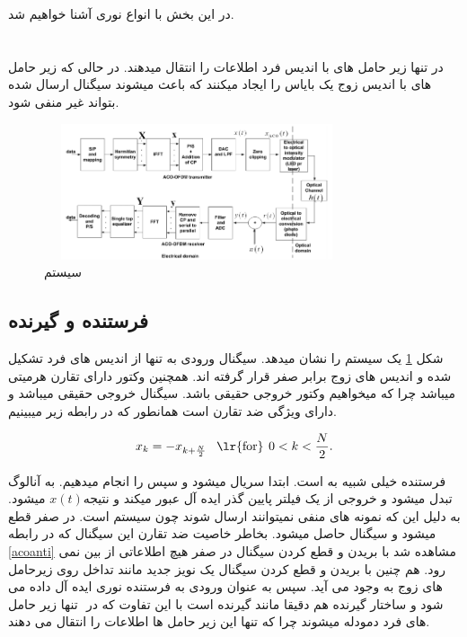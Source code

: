 \documentclass{article}
\begin{document}
در این بخش با انواع   نوری آشنا خواهیم شد.
\section{}


در        
تنها زیر حامل های با اندیس فرد اطلاعات را انتقال میدهند. در حالی که زیر حامل های با اندیس زوج یک بایاس را ایجاد میکنند که باعث میشوند  سیگنال  ارسال شده بتواند غیر منفی شود.\cite{2}\ 
\begin{figure}[h!]
\begin{center}
\includegraphics[width=9cm, height=4cm]{aco.PNG}
\end{center}
\caption{  سیستم }
\label{acomodel}

\end{figure}
\subsection{فرستنده و گیرنده}

 شکل \ref{acomodel} یک سیستم  را نشان میدهد. سیگنال ورودی به  تنها از اندیس های فرد تشکیل شده و اندیس های زوج برابر صفر قرار گرفته اند. ‌همچنین وکتور   دارای تقارن هرمیتی   میباشد چرا که میخواهیم وکتور خروجی    حقیقی باشد.\cite{1} سیگنال خروجی    حقیقی میباشد و دارای ویژگی ضد تقارن  است  همانطور که در رابطه زیر میبینیم.\cite{6}

\begin{equation}
x_{k} = -x_{k+\frac{N}{2}}    \hspace{8pt}\textrm{\lr{for}}  \hspace{4pt}  0 < k < \frac{N}{2} .
\label{acoanti}
\end{equation}

فرستنده  خیلی شبیه به  است. ابتدا  سریال میشود و سپس   را انجام میدهیم.    به آنالوگ تبدل میشود و خروجی از یک فیلتر پایین گذر ایده آل عبور میکند و نتیجه$ x(t)‌$ میشود. به دلیل این که نمونه های منفی نمیتوانند ارسال شوند چون سیستم  است. در صفر قطع میشود و سیگنال حاصل میشود. بخاطر خاصیت ضد تقارن این سیگنال که در رابطه \ref{acoanti}  مشاهده شد با بریدن و قطع کردن سیگنال در صفر هیچ اطلاعاتی از بین نمی رود. هم چنین با بریدن و قطع کردن سیگنال یک نویز جدید مانند تداخل روی زیرحامل های زوج به وجود می آید.\cite{4} سپس   به عنوان ورودی به فرستنده نوری ایده آل داده می شود و ساختار گیرنده هم دقیقا مانند گیرنده   است با این تفاوت که در  ‌ تنها زیر حامل های فرد دمودله میشوند چرا که تنها این زیر حامل ها اطلاعات را انتقال می دهند.
\end{document}
